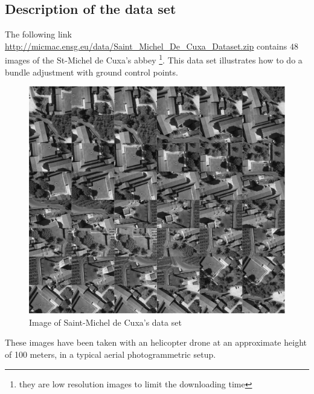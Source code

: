 
\subsection{Description of the data set}
\label{Cuxa:DataSet}

The following link \url{http://micmac.ensg.eu/data/Saint_Michel_De_Cuxa_Dataset.zip} contains
$48$ images of the St-Michel de Cuxa's abbey \footnote{they are low resolution images
to limit the  downloading time}. This data set illustrates how to
do a bundle adjustment with ground control points.

\begin{figure}[H]
\begin{center}
\includegraphics[width=160mm]{FIGS/Cuxa/Planche.jpg}
\caption{Image of Saint-Michel de Cuxa's data set }
\end{center}
\label{FIG:Glob:Cuxa}
\end{figure}

These images have been taken with an helicopter drone at an approximate height of 100 meters, in a typical aerial photogrammetric setup.

